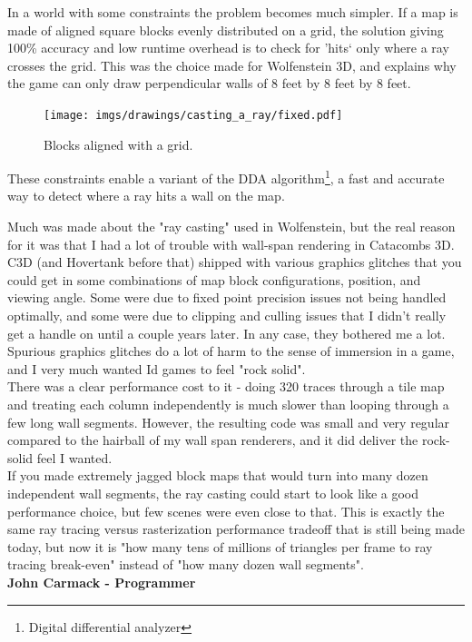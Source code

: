 In a world with some constraints the problem becomes much simpler. If a map is made of aligned square blocks evenly distributed on a grid, the solution giving 100\% accuracy and low runtime overhead is to check for 'hits` only where a ray crosses the grid. This was the choice made for Wolfenstein 3D, and explains why the game can only draw perpendicular walls of 8 feet by 8 feet by 8 feet.
\begin{figure}[H]
\centering
\texttt{[image: imgs/drawings/casting\_a\_ray/fixed.pdf]}
 \caption{Blocks aligned with a grid.}
\end{figure}
\par
These constraints enable a variant of the DDA algorithm\footnote{Digital differential analyzer}, a fast and accurate way to detect where a ray hits a wall on the map.
\par
\begin{fancyquotes}
\par
Much was made about the "ray casting" used in Wolfenstein, but the real reason for it was that I had a lot of trouble with wall-span rendering in Catacombs 3D.  C3D (and Hovertank before that) shipped with various graphics glitches that you could get in some combinations of map block configurations, position, and viewing angle.  Some were due to fixed point precision issues not being handled optimally, and some were due to clipping and culling issues that I didn't really get a handle on until a couple years later.  In any case, they bothered me a lot.  Spurious graphics glitches do a lot of harm to the sense of immersion in a game, and I very much wanted Id games to feel "rock solid".
 \bigskip \\
There was a clear performance cost to it - doing 320 traces through a tile map and treating each column independently is much slower than looping through a few long wall segments.  However, the resulting code was small and very regular compared to the hairball of my wall span renderers, and it did deliver the rock-solid feel I wanted.
 \bigskip \\
If you made extremely jagged block maps that would turn into many dozen independent wall segments, the ray casting could start to look like a good performance choice, but few scenes were even close to that.  This is exactly the same ray tracing versus rasterization performance tradeoff that is still being made today, but now it is "how many tens of millions of triangles per frame to ray tracing break-even" instead of "how many dozen wall segments".
 \bigskip \\
\textbf{John Carmack - Programmer}
 \end{fancyquotes}



